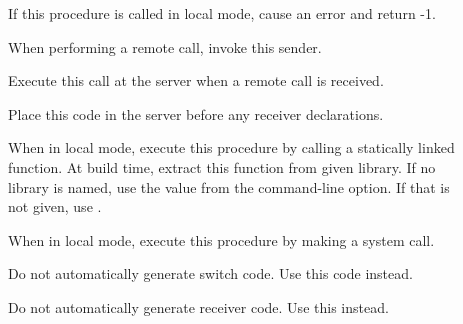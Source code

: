 \begin{description}
\item[] If this procedure is called in local mode, cause an error and return -1.
\item[]  When performing a remote call, invoke this sender.
\item[] Execute this call at the server when a remote call is received.
\item[] Place this code in the server before any receiver declarations. 
\item[] When in local mode, execute this procedure by calling a statically linked function.  At build time, extract this function from given library.  If no library is named, use the value from the  command-line option.  If that is not given, use .
\item[] When in local mode, execute this procedure by making a system call.
\item[]  Do not automatically generate switch code.  Use this code instead.
\item[]  Do not automatically generate receiver code.  Use this instead.
\end{description}






